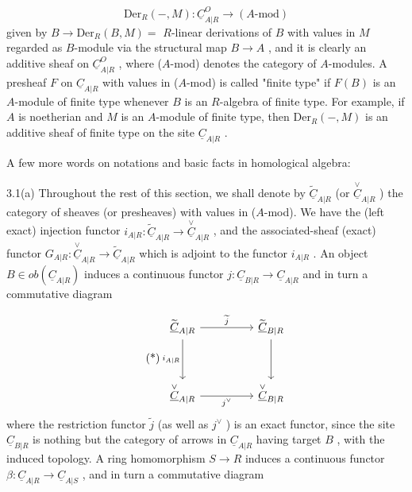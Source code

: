 \begin{equation*}
\mathrm{Der}_R(-,M): \underline{C}^{O}_{A|R} \to (A\text{-mod})
\end{equation*}
given by  $B \to \mathrm{Der}_R(B,M) =$ $R$-linear derivations of  $B$  with values in  $M$  regarded as $B$-module via the structural map  $B \to A$ , and it is clearly an additive sheaf on  $\underline{C}^{O}_{A|R}$ , where ($A$-mod) denotes the category of $A$-modules. A presheaf  $F$  on  $\underline{C}_{A|R}$  with values in  ($A$-mod)  is called "finite type" if  $F(B)$  is an $A$-module of finite type whenever  $B$  is an $R$-algebra of finite type. For example, if  $A$  is noetherian and  $M$  is an $A$-module of finite type, then  $\mathrm{Der}_R(-,M)$  is an additive sheaf of finite type on the site  $\underline{C}_{A|R}$ .

A few more words on notations and basic facts in homological algebra:

3.1(a)  Throughout the rest of this section, we shall denote by  $\widetilde{\underline{C}}_{A|R}$  (or  $\overset{\vee}{\underline{C}}_{A|R}$ )  the category of sheaves (or presheaves) with values in ($A$-mod). We have the (left exact) injection functor  $i_{A|R}: \widetilde{\underline{C}}_{A|R} \to \overset{\vee}{\underline{C}}_{A|R}$ , and the associated-sheaf (exact)
functor  $G_{A|R}: \overset{\vee}{\underline{C}}_{A|R} \to \widetilde{\underline{C}}_{A|R}$  which is adjoint to the functor  $i_{A|R}$ . An object  $B \in ob(\underline{C}_{A|R})$  induces a continuous functor  $j : \underline{C}_{B|R} \to \underline{C}_{A|R}$  and in turn a commutative diagram

\begin{equation}\tag{*}
\begin{tikzcd}[column sep=huge, row sep=huge]
\widetilde{\underline{C}}_{A|R} \arrow[r, "\widetilde{j}"] \arrow[d, "i_{A|R}"'] & \widetilde{\underline{C}}_{B|R} \arrow[d] \\
\overset{\vee}{\underline{C}}_{A|R} \arrow[r, "j^{\vee}"'] & \overset{\vee}{\underline{C}}_{B|R}
\end{tikzcd}
\end{equation}
where the restriction functor  $\widetilde{j}$  (as well as  $j^{\vee}$ )  is an exact functor, since the site  $\underline{C}_{B|R}$  is nothing but the category of arrows in  $\underline{C}_{A|R}$  having target  $B$ , with the induced topology. A ring homomorphism  $S \to R$  induces a continuous functor  $\beta : \underline{C}_{A|R} \to \underline{C}_{A|S}$ , and in turn a commutative diagram

